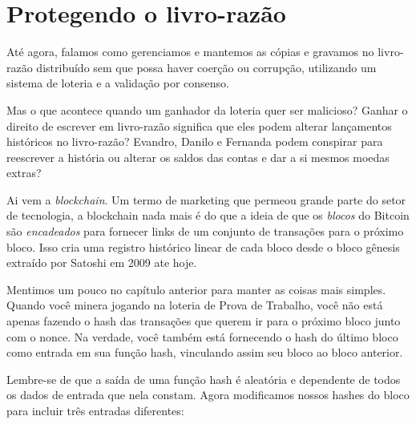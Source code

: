 \chapter{Protegendo o livro-razão}
\label{ch:capitulo6}
Até agora, falamos como gerenciamos e mantemos as cópias e gravamos no livro-razão distribuído sem que possa haver coerção ou corrupção, utilizando um sistema de loteria e a validação por consenso.

Mas o que acontece quando um ganhador da loteria quer ser malicioso? Ganhar o direito de escrever em livro-razão significa que eles podem alterar lançamentos históricos no livro-razão? Evandro, Danilo e Fernanda podem conspirar para reescrever a história ou alterar os saldos das contas e dar a si mesmos moedas extras?

Ai vem a \textit{blockchain}. Um termo de marketing que permeou grande parte do setor de tecnologia, a blockchain nada mais é do que a ideia de que os \textit{blocos} do Bitcoin são \textit{encadeados} para fornecer links de um conjunto de transações para o próximo bloco.
Isso cria uma registro histórico linear de cada bloco desde o bloco gênesis extraído por Satoshi em 2009 ate hoje.

Mentimos um pouco no capítulo anterior para manter as coisas mais simples.
Quando você minera jogando na loteria de Prova de Trabalho, você não está apenas fazendo o hash das transações que querem ir para o próximo bloco junto com o nonce.
Na verdade, você também está fornecendo o hash do último bloco como entrada em sua função hash, vinculando assim seu bloco ao bloco anterior.






Lembre-se de que a saída de uma função hash é aleatória e dependente de todos os dados de entrada que nela constam. 
Agora modificamos nossos hashes do bloco para incluir três entradas diferentes:

